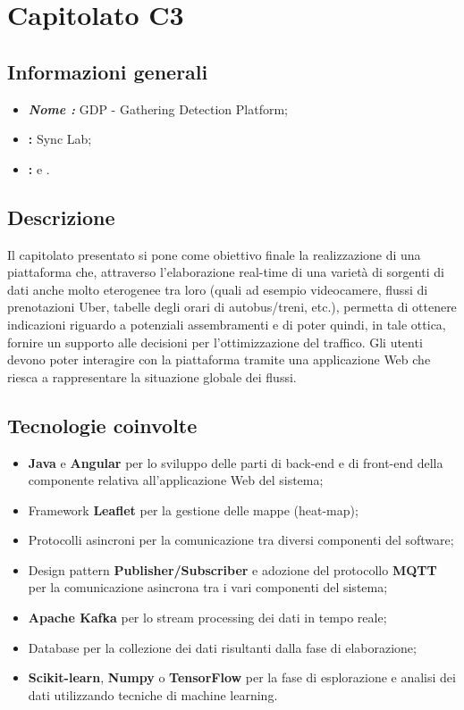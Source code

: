 \section{Capitolato C3}

\subsection{Informazioni generali}{
\begin{itemize}
\item \textbf{\emph{Nome :}} GDP - Gathering Detection Platform;
\item \textbf{\commitProg:} Sync Lab;
\item \textbf{\proponProg:} \VT{} e \CR.
\end{itemize}
}

\subsection{Descrizione}{
Il capitolato presentato si pone come obiettivo finale la realizzazione di una piattaforma che, attraverso l'elaborazione real-time di una varietà di sorgenti di dati anche molto eterogenee tra loro (quali ad esempio videocamere, flussi di prenotazioni Uber, tabelle degli orari di autobus/treni, etc.), permetta di ottenere indicazioni riguardo a potenziali assembramenti e di poter quindi, in tale ottica, fornire un supporto alle decisioni per l'ottimizzazione del traffico.
Gli utenti devono poter interagire con la piattaforma tramite una applicazione Web che riesca a rappresentare la situazione globale dei flussi.
}

\subsection{Tecnologie coinvolte}{
\begin{itemize}
\item \textbf{Java} e \textbf{Angular} per lo sviluppo delle parti di back-end e di front-end della componente relativa all'applicazione Web del sistema; 
\item Framework \textbf{Leaflet} per la gestione delle mappe (heat-map);
\item Protocolli asincroni per la comunicazione tra diversi componenti del software;
\item Design pattern \textbf{Publisher/Subscriber} e adozione del protocollo \textbf{MQTT} per la comunicazione asincrona tra i vari componenti del sistema;
\item \textbf{Apache Kafka} per lo stream processing dei dati in tempo reale;
\item Database per la collezione dei dati risultanti dalla fase di elaborazione;
\item \textbf{Scikit-learn}, \textbf{Numpy} o \textbf{TensorFlow} per la fase di esplorazione e analisi dei dati utilizzando tecniche di machine learning.
\end{itemize}
}

